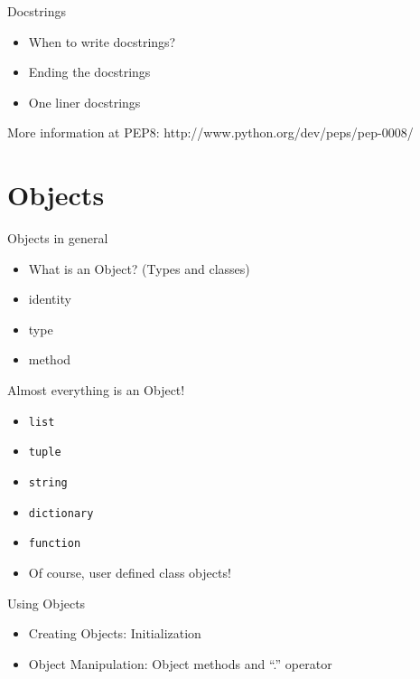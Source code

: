 \documentclass[14pt,compress]{beamer}
\newcounter{time}
\newcommand{\inctime}[1]{\addtocounter{time}{#1}{\tiny \thetime\ m}}
\newcommand{\typ}[1]{\texttt{#1}}
\begin{document}
\begin{frame}{Docstrings}
  \begin{itemize}
        \item When to write docstrings?
        \item Ending the docstrings
        \item One liner docstrings
   \end{itemize}
More information at PEP8: http://www.python.org/dev/peps/pep-0008/
\inctime{10}
\end{frame}


\section{Objects}
\begin{frame}{Objects in general}
    \begin{itemize}
        \item What is an Object? (Types and classes)
        \item identity
        \item type
        \item method
      \end{itemize}
\end{frame}

\begin{frame}{Almost everything is an Object!}
  \begin{itemize}
    \item \typ{list}
    \item \typ{tuple}
    \item \typ{string}
    \item \typ{dictionary}
    \item \typ{function}
    \item Of course, user defined class objects!
  \end{itemize}
\end {frame}

\begin{frame}{Using Objects}
  \begin{itemize}
    \item Creating Objects: Initialization
    \item Object Manipulation: Object methods and ``.'' operator
  \end{itemize}
\end{frame}
\end{document}
